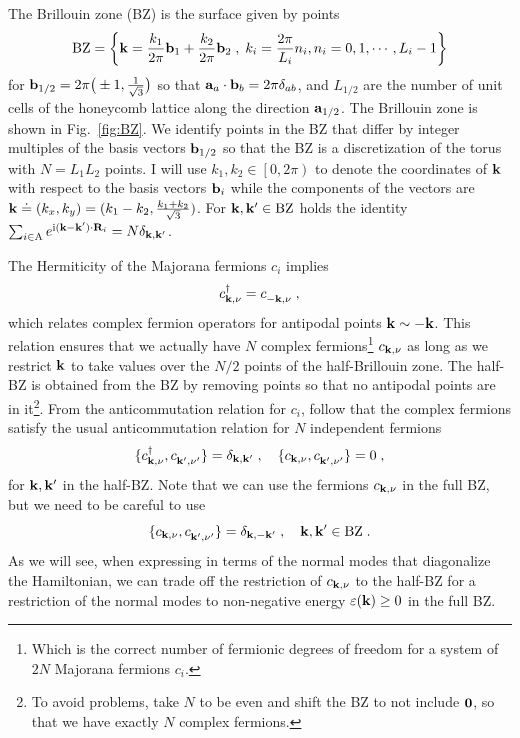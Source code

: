 The Brillouin zone (BZ) is the surface given by points
\begin{equation}
    \text{BZ} = \left\{ \mathbf{k}=\frac{k_1}{2\pi}\mathbf{b}_1 + \frac{k_2}{2\pi}\mathbf{b}_2 \; , \; k_i=\frac{2\pi}{L_i}n_i, n_i = 0,1,\cdots,L_i-1
    \right\}
\end{equation}
for $\mathbf{b}_{1/2}= 2\pi \big(\pm1,\frac{1}{\sqrt{3}}\big)$ so that $\mathbf{a}_{{a}} \cdot \mathbf{b}_{{b}}=2\pi \delta_{{a}{b}}$, and $L_{1/2}$ are the number of unit cells of the honeycomb lattice along the direction $\mathbf{a}_{1/2}$. The Brillouin zone is shown in Fig.~\ref{fig:BZ}.
We identify points in the BZ that differ by integer multiples of the basis vectors $\mathbf{b}_{1/2}$ so that the BZ is a  discretization of the torus with $N=L_1L_2$ points.
I will use $k_1, k_2 \in \left[ 0,2 \pi\right)$  to denote the coordinates of $\mathbf{k}$ with respect to the basis vectors $\mathbf{b}_i$ while the components of the vectors are $\mathbf{k}\doteq (k_x,k_y)=(k_1-k_2,\frac{k_1+k_2}{\sqrt{3}})$. For $\mathbf{k}, \mathbf{k}' \in {\text{BZ}}$ holds the identity $\sum_{i\in\mathrm A} e^{\mathrm{i} (\mathbf{k}-\mathbf{k}' )\cdot \mathbf{R}_i}=N \delta_{\mathbf{k},\mathbf{k}'}$.

The Hermiticity of the Majorana fermions $c_i$ implies
\begin{equation}
    c_{\mb{k},\nu}^\dagger=c_{-\mb{k},\nu }^\pd \; ,
\end{equation}
which relates complex fermion operators for antipodal points $\mathbf{k} \sim  -\mathbf{k}$. This relation ensures that we actually have $N$ complex fermions\footnote{Which is the correct number of fermionic degrees of freedom for a system of $2N$ Majorana fermions $c_{i}$.} $c_{\mathbf{k},\nu}$ as long as we restrict $\mathbf{k}$ to take values over the $N/2$ points of the half-Brillouin zone.
The half-BZ is obtained from the BZ by removing points so that no antipodal points are in it\footnote{To avoid problems, take $N$ to be even and shift the BZ to not include $\mathbf{0}$, so that we have exactly $N$ complex fermions.}.
From the anticommutation relation for $c_i$, follow that the complex fermions satisfy the usual anticommutation relation for $N$ independent fermions
\begin{equation}
    \{ c_{\mb{k},\nu }^\dagger,c_{\mb{k}',\nu' }^\pd  \}=\delta_{\mb{k},\mb{k}'} \; , \quad
    \{ c_{\mb{k},\nu },c_{\mb{k}',\nu' }^\pd  \}= 0 \; ,
\end{equation}
for $\mathbf{k},\mathbf{k}'$ in the half-BZ.
Note that we can use the fermions $c_{\mathbf{k},\nu}$ in the full BZ, but we need to be careful to use
\begin{equation}
     \{ c_{\mb{k},\nu },c_{\mb{k}',\nu' }^\pd  \}= \delta_{\mb{k},-\mb{k}'} \; , \quad \mb{k},\mb{k}' \in \text{BZ} \; .
\end{equation}
As we will see, when expressing in terms of the normal modes that diagonalize the Hamiltonian, we can trade off the restriction of $c_{\mathbf{k},\nu}$ to the half-BZ for a restriction of the normal modes to non-negative energy $\varepsilon(\mathbf{k})\geq 0$ in the full BZ.

